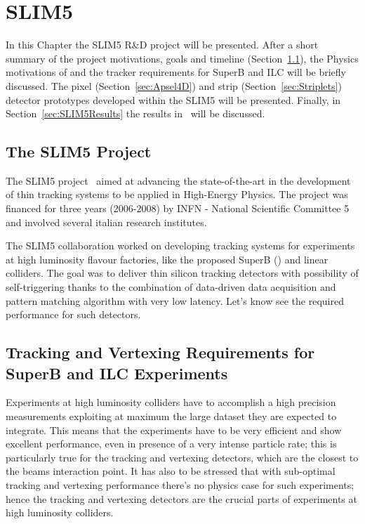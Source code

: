 \chapter{SLIM5}
\label{chap:SLIM5}
In this Chapter the SLIM5 R\&D project will be presented. After a short summary of the project 
motivations, goals and timeline (Section~\ref{sec:SLIM5Project}), the Physics motivations of 
and the tracker requirements for SuperB and ILC will be briefly discussed. 
The pixel  (Section~\ref{sec:Apsel4D}) and strip (Section~\ref{sec:Striplets}) 
detector prototypes developed 
within the SLIM5 will be presented. Finally, in Section~\ref{sec:SLIM5Results} the results 
in~\cite{BETTARINI2010942,BOMBEN2010159,NERI2010195} will be discussed.


\section{The SLIM5 Project}
\label{sec:SLIM5Project}
The SLIM5 project~\cite{SLIM5:proj} aimed at advancing the state-of-the-art in the development of thin 
tracking systems to be applied in High-Energy Physics. The project was financed for three years
 (2006-2008) by INFN - National Scientific Committee 5~\cite{INFN_V} and involved several 
 italian research institutes. 
 
 The SLIM5 collaboration worked on developing tracking systems for experiments at 
 high luminosity flavour 
 factories, like the proposed SuperB (\cite{Baszczyk:2013xua}) and linear colliders. The goal was to deliver thin silicon tracking detectors with possibility 
 of self-triggering thanks to the combination of data-driven data acquisition and pattern matching 
 algorithm with very low latency.
Let's know see the required performance for such detectors. 

\section{Tracking and Vertexing Requirements for SuperB and ILC Experiments}
Experiments at high luminosity colliders have to accomplish a high precision measurements 
exploiting at maximum the large dataset they are expected to integrate. 
This means that the experiments have to be very efficient and show excellent performance, 
even in presence of a very intense particle rate; this is particularly true for the tracking and 
vertexing detectors, which are the closest to the beams interaction point. It has also to be stressed 
that with sub-optimal tracking and vertexing performance there's no physics case for such 
experiments; hence the tracking and vertexing detectors are the crucial parts of experiments at 
high luminosity colliders.

